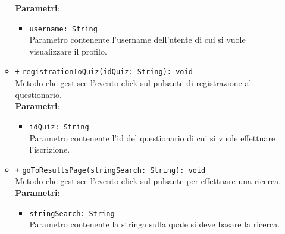 \begin{itemize}
\begin{itemize}
		\textbf{Parametri}:
		\begin{itemize}
			\item \texttt{username: String} \\
			Parametro contenente l'username dell'utente di cui si vuole visualizzare il profilo.
		\end{itemize} 
		\item \texttt{+} \texttt{registrationToQuiz(idQuiz: String): void} \\
		Metodo che gestisce l'evento click sul pulsante di registrazione al questionario.\\
		\textbf{Parametri}:
		\begin{itemize}
			\item \texttt{idQuiz: String} \\
			Parametro contenente l'id del questionario di cui si vuole effettuare l'iscrizione.
		\end{itemize} 
		\item \texttt{+} \texttt{goToResultsPage(stringSearch: String): void} \\
		Metodo che gestisce l'evento click sul pulsante per effettuare una ricerca.\\
		\textbf{Parametri}:
		\begin{itemize}
			\item \texttt{stringSearch: String} \\
			Parametro contenente la stringa sulla quale si deve basare la ricerca.
		\end{itemize} 
	\end{itemize}
\end{itemize}

